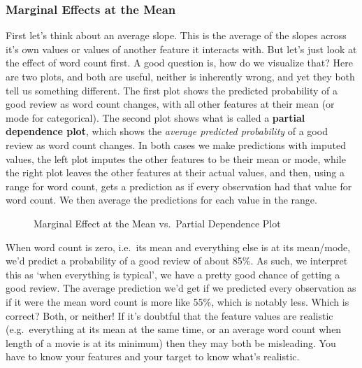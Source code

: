 \documentclass[
  letterpaper,
]{krantz}
\begin{document}
\subsubsection{Marginal Effects at the
Mean}\label{marginal-effects-at-the-mean}

First let's think about an average slope. This is the average of the
slopes across it's own values or values of another feature it interacts
with. But let's just look at the effect of word count first. A good
question is, how do we visualize that? Here are two plots, and both are
useful, neither is inherently wrong, and yet they both tell us something
different. The first plot shows the predicted probability of a good
review as word count changes, with all other features at their mean (or
mode for categorical). The second plot shows what is called a
\textbf{partial dependence plot}, which shows the \emph{average
predicted probability} of a good review as word count changes. In both
cases we make predictions with imputed values, the left plot imputes the
other features to be their mean or mode, while the right plot leaves the
other features at their actual values, and then, using a range for word
count, gets a prediction as if every observation had that value for word
count. We then average the predictions for each value in the range.

\begin{figure}[H]


\caption{\label{fig-r-mem-vs-pdp}Marginal Effect at the Mean vs.~Partial
Dependence Plot}

\end{figure}%

When word count is zero, i.e.~its mean and everything else is at its
mean/mode, we'd predict a probability of a good review of about 85\%. As
such, we interpret this as `when everything is typical', we have a
pretty good chance of getting a good review. The average prediction we'd
get if we predicted every observation as if it were the mean word count
is more like 55\%, which is notably less. Which is correct? Both, or
neither! If it's doubtful that the feature values are realistic
(e.g.~everything at its mean at the same time, or an average word count
when length of a movie is at its minimum) then they may both be
misleading. You have to know your features and your target to know
what's realistic.
\end{document}

